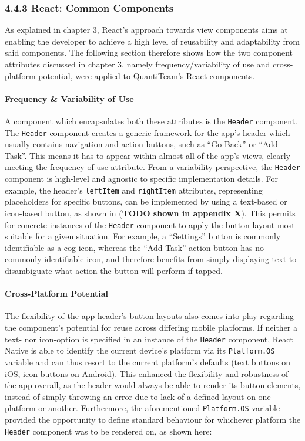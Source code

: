 \documentclass[12pt]{report}
\let\oldparagraph\paragraph
\renewcommand{\paragraph}[1]{\oldparagraph{#1}\mbox{}}
\begin{document}
\subsubsection{4.4.3 React: Common
Components}\label{react-common-components}

As explained in chapter 3, React's approach towards view components aims
at enabling the developer to achieve a high level of reusability and
adaptability from said components. The following section therefore shows
how the two component attributes discussed in chapter 3, namely
frequency/variability of use and cross-platform potential, were applied
to QuantiTeam's React components.

\paragraph{Frequency \& Variability of
Use}\label{frequency-variability-of-use}

A component which encapsulates both these attributes is the
\texttt{Header} component. The \texttt{Header} component creates a
generic framework for the app's header which usually contains navigation
and action buttons, such as ``Go Back'' or ``Add Task''. This means it
has to appear within almost all of the app's views, clearly meeting the
frequency of use attribute. From a variability perspective, the
\texttt{Header} component is high-level and agnostic to specific
implementation details. For example, the header's \texttt{leftItem} and
\texttt{rightItem} attributes, representing placeholders for specific
buttons, can be implemented by using a text-based or icon-based button,
as shown in (\textbf{TODO shown in appendix X}). This permits for
concrete instances of the \texttt{Header} component to apply the button
layout most suitable for a given situation. For example, a ``Settings''
button is commonly identifiable as a cog icon, whereas the ``Add Task''
action button has no commonly identifiable icon, and therefore benefits
from simply displaying text to disambiguate what action the button will
perform if tapped.

\paragraph{Cross-Platform Potential}\label{cross-platform-potential}

The flexibility of the app header's button layouts also comes into play
regarding the component's potential for reuse across differing mobile
platforms. If neither a text- nor icon-option is specified in an
instance of the \texttt{Header} component, React Native is able to
identify the current device's platform via its \texttt{Platform.OS}
variable and can thus resort to the current platform's defaults (text
buttons on iOS, icon buttons on Android). This enhanced the flexibility
and robustness of the app overall, as the header would always be able to
render its button elements, instead of simply throwing an error due to
lack of a defined layout on one platform or another. Furthermore, the
aforementioned \texttt{Platform.OS} variable provided the opportunity to
define standard behaviour for whichever platform the \texttt{Header}
component was to be rendered on, as shown here:
\end{document}
